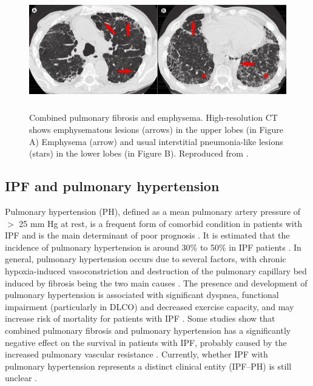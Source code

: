 \begin{figure}[htbp]
  \centering 
  \includegraphics[height=2.05in]{Background/Image/CPFEImaging.png}
  \caption{ Combined pulmonary fibrosis and emphysema. High-resolution CT shows emphysematous lesions (arrows) in the upper lobes (in Figure A) Emphysema (arrow) and usual interstitial pneumonia-like lesions (stars) in the lower lobes (in Figure B). Reproduced from \citep{king2011idiopathic}.}
  \label{fig:CPFEImaging}
\end{figure}

\subsection{IPF and pulmonary hypertension}
Pulmonary hypertension (PH), defined as a mean pulmonary artery pressure of $>$ 25 mm Hg at rest, is a frequent form of comorbid condition in patients with IPF and is the main determinant of poor prognosis \citep{raghu2011official, xaubet2017idiopathic}. It is estimated that the incidence of pulmonary hypertension is around 30\% to 50\% in IPF patients \citep{king2017idiopathic}. In general, pulmonary hypertension occurs due to several factors, with chronic hypoxia-induced vasoconstriction and destruction of the pulmonary capillary bed induced by fibrosis being the two main causes \citep{hayes2016influence}. The presence and development of pulmonary hypertension is associated with significant dyspnea, functional impairment (particularly in DLCO) and decreased exercise capacity, and may increase risk of mortality for patients with IPF \citep{mejia2009idiopathic,lettieri2006prevalence,nadrous2005impact}. Some studies show that combined pulmonary fibrosis and pulmonary hypertension has a significantly negative effect on the survival in patients with IPF, probably caused by the increased pulmonary vascular resistance \citep{raghu2011official, king2011idiopathic}. Currently, whether IPF with pulmonary hypertension represents a distinct  clinical entity (IPF–PH) is still unclear \citep{raghu2011official}.


